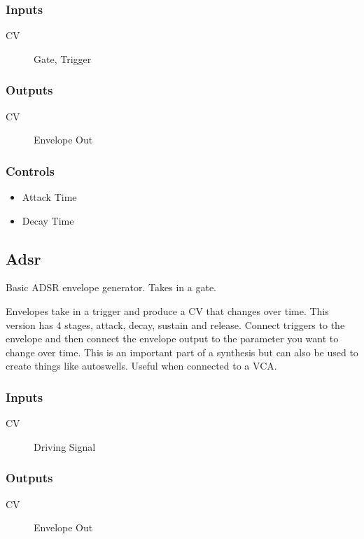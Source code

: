 \subsubsection{Inputs}
\begin{description}
\item [CV] Gate, Trigger
\end{description}

\subsubsection{Outputs}
\begin{description}
\item [CV] Envelope Out
\end{description}

\subsubsection{Controls}
\begin{itemize}
\item Attack Time
\item Decay Time
\end{itemize}

\subsection{Adsr}

Basic ADSR envelope generator. Takes in a gate.

Envelopes take in a  trigger and produce a CV that changes over time.
                  This version has 4 stages, attack, decay, sustain and release. Connect triggers to the envelope and then connect the envelope output to the parameter you want to change over time.
                  This is an important part of a synthesis but can also be used to create things like autoswells. Useful when connected to a VCA.

\subsubsection{Inputs}
\begin{description}
\item [CV] Driving Signal
\end{description}

\subsubsection{Outputs}
\begin{description}
\item [CV] Envelope Out
\end{description}

